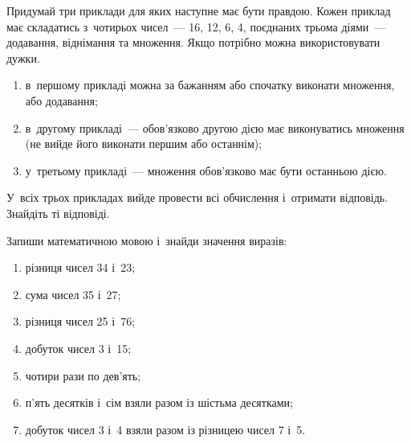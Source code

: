 \problem
Придумай три приклади для яких наступне має бути правдою.
Кожен приклад має складатись з~чотирьох чисел~--- 16, 12, 6, 4,
поєднаних трьома діями~--- додавання, віднімання та множення.
Якщо потрібно можна використовувати дужки.
\begin{enumerate}
    \item в~першому прикладі можна за бажанням або
    спочатку виконати множення, або додавання;
    \item в~другому прикладі~--- обов'язково другою дією має
    виконуватись множення (не вийде його виконати першим або останнім);
    \item у~третьому прикладі~--- множення обов'язково має бути останньою дією.
\end{enumerate}
У~всіх трьох прикладах вийде провести всі обчислення і~отримати відповідь. Знайдіть ті відповіді.


\problem
Запиши математичною мовою і~знайди значення виразів:
\begin{enumerate}
    \item різниця чисел 34 і~23;
    \item сума чисел 35 і~27;
    \item різниця чисел 25 і~76;
    \item добуток чисел 3 і~15;
    \item чотири рази по дев'ять;
    \item п'ять десятків і~сім взяли разом із шістьма десятками;
    \item добуток чисел 3 і~4 взяли разом із різницею чисел 7 і~5.
\end{enumerate}


